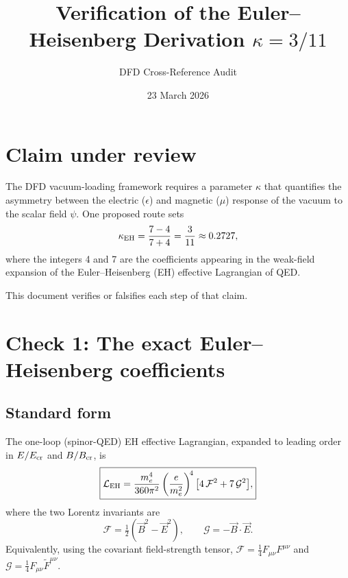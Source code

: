 \documentclass[12pt]{article}
\title{Verification of the Euler--Heisenberg Derivation $\kappa = 3/11$}
\author{DFD Cross-Reference Audit}
\date{23 March 2026}
\newcommand{\vE}{\vec{E}}
\newcommand{\vB}{\vec{B}}
\begin{document}
\maketitle

\section{Claim under review}

The DFD vacuum-loading framework requires a parameter $\kappa$ that
quantifies the asymmetry between the electric ($\epsilon$) and magnetic
($\mu$) response of the vacuum to the scalar field $\psi$.  One
proposed route sets
\begin{equation}
\kappa_{\rm EH} = \frac{7 - 4}{7 + 4} = \frac{3}{11} \approx 0.2727,
\label{eq:claim}
\end{equation}
where the integers 4 and 7 are the coefficients appearing in the
weak-field expansion of the Euler--Heisenberg (EH) effective
Lagrangian of QED.

This document verifies or falsifies each step of that claim.

\section{Check 1: The exact Euler--Heisenberg coefficients}

\subsection{Standard form}

The one-loop (spinor-QED) EH effective Lagrangian, expanded to
leading order in $E/E_{\rm cr}$ and $B/B_{\rm cr}$, is
\begin{equation}
\boxed{
\mathcal{L}_{\rm EH}
= \frac{m_e^4}{360\pi^2}
  \left(\frac{e}{m_e^2}\right)^{\!4}
  \bigl[4\,\mathcal{F}^2 + 7\,\mathcal{G}^2\bigr],}
\label{eq:EH}
\end{equation}
where the two Lorentz invariants are
\begin{equation}
\mathcal{F} = \tfrac{1}{2}(\vB^2 - \vE^2),
\qquad
\mathcal{G} = -\vB\cdot\vE.
\end{equation}
Equivalently, using the covariant field-strength tensor,
$\mathcal{F} = \tfrac{1}{4}F_{\mu\nu}F^{\mu\nu}$ and
$\mathcal{G} = \tfrac{1}{4}F_{\mu\nu}\tilde{F}^{\mu\nu}$.
\end{document}
